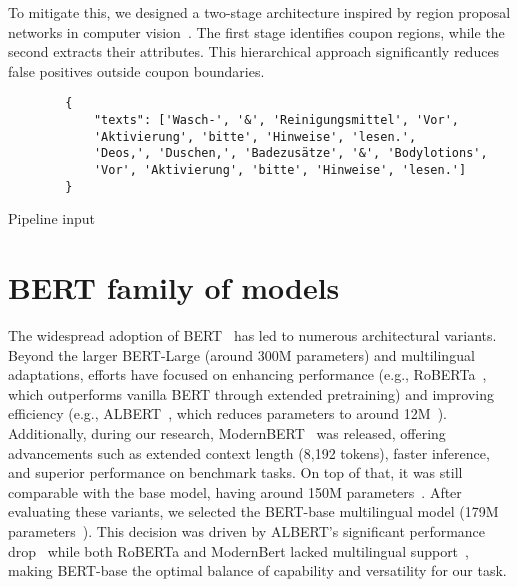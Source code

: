 \documentclass[licencjacka,en]{pracamgr}
\begin{document}
To mitigate this, we designed a two-stage architecture inspired by region proposal networks in computer vision~\cite{Region_proposal}. The first stage identifies coupon regions, while the second extracts their attributes. This hierarchical approach significantly reduces false positives outside coupon boundaries.
\begin{center}
   \begin{listing}
        \begin{verbatim}
        {
            "texts": ['Wasch-', '&', 'Reinigungsmittel', 'Vor',
            'Aktivierung', 'bitte', 'Hinweise', 'lesen.',
            'Deos,', 'Duschen,', 'Badezusätze', '&', 'Bodylotions',
            'Vor', 'Aktivierung', 'bitte', 'Hinweise', 'lesen.']
        }
        \end{verbatim}
        \caption{Pipeline input}
        \label{list:sel-input}
    \end{listing}
\end{center}

\section{BERT family of models}
The widespread adoption of BERT~\cite{BERT_hf} has led to numerous architectural variants. Beyond the larger BERT-Large (around 300M parameters) and multilingual adaptations, efforts have focused on enhancing performance (e.g., RoBERTa~\cite{RoBERTa}, which outperforms vanilla BERT through extended pretraining) and improving efficiency (e.g., ALBERT~\cite{ALBERT}, which reduces parameters to  around 12M~\cite{ALBERT_hf}).
Additionally, during our research, ModernBERT~\cite{ModernBERTPaper} was released, offering advancements such as extended context length (8,192 tokens), faster inference, and superior performance on benchmark tasks. On top of that, it was still comparable with the base model, having around 150M parameters~\cite{ModernBERThf}.
After evaluating these variants, we selected the BERT-base multilingual model (179M parameters~\cite{BERT_multiling}). This decision was driven by ALBERT’s significant performance drop~\cite{BERT_comp} while both RoBERTa and ModernBert lacked multilingual support~\cite{FBAIHF}, making BERT-base the optimal balance of capability and versatility for our task.
\end{document}
